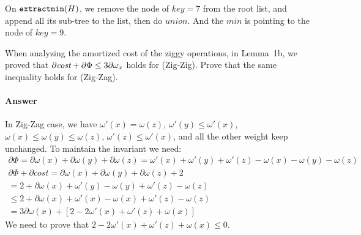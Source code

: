 \documentclass[11pt]{article}
\newcommand{\extractmin}{{\mbox{\tt extractmin}}}
\begin{document}
On $\extractmin(H)$, we remove the node of $key=7$ from the root list, and append all its sub-tree to the list, then do $union$. And the $min$ is pointing to the node of $key=9$.




\newcommand{\cost}{{\mbox{\it cost}}}

\begin{problem}
When analyzing the amortized cost of the ziggy operations,
in Lemma~1b,
we proved that $\partial\cost + \partial\Phi \le 3\partial\omega_x$
holds for (Zig-Zig). Prove that the same inequality
holds for (Zig-Zag).
\end{problem}

\paragraph{Answer}
In Zig-Zag case, we have $\omega'(x) = \omega(z)$, $\omega'(y) \leq \omega'(x)$, $\omega(x) \leq \omega(y) \leq \omega(z)$, $\omega'(z) \leq \omega'(x)$, and all the other weight keep unchanged.
To maintain the invariant we need:
\begin{gather*}
    \partial\Phi = \partial\omega(x) + \partial\omega(y) + \partial\omega(z) = \omega'(x) + \omega'(y) + \omega'(z) - \omega(x) - \omega(y) - \omega(z) \\
    \partial\Phi + \partial cost = \partial\omega(x) + \partial\omega(y) + \partial\omega(z) + 2 \\ 
    = 2 + \partial\omega(x) + \omega'(y) - \omega(y) + \omega'(z) - \omega(z) \\
    \leq 2 + \partial\omega(x) + \omega'(x) - \omega(x) + \omega'(z) - \omega(z) \\
    = 3\partial\omega(x) + [2 - 2\omega'(x) + \omega'(z) + \omega(x)]
\end{gather*}
We need to prove that $2 - 2\omega'(x) + \omega'(z) + \omega(x) \leq 0$.
\end{document}
